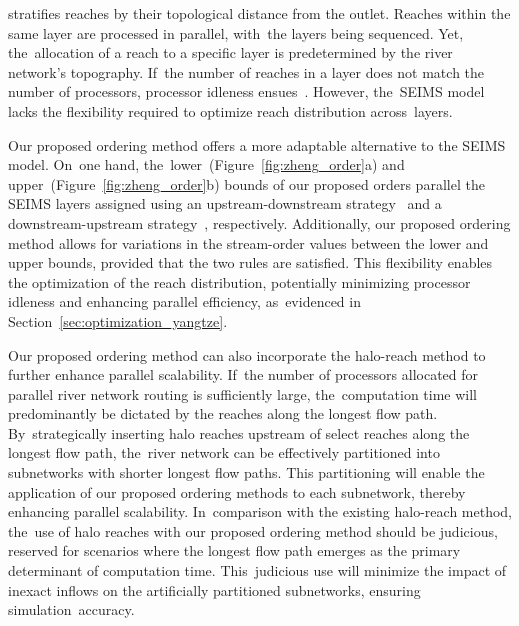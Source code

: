 \documentclass[water,article,accept,pdftex,moreauthors]{Definitions/mdpi}
\begin{document}
 stratifies reaches by their topological distance from the outlet. Reaches within the same layer are processed in parallel, with~the layers being sequenced. Yet, the~allocation of a reach to a specific layer is predetermined by the river network's topography. If~the number of reaches in a layer does not match the number of processors, processor idleness ensues~\cite{liu2014EMS, zhu2019EMS}. However, the~SEIMS model lacks the flexibility required to optimize reach distribution across~layers.

Our proposed ordering method offers a more adaptable alternative to the SEIMS model. On~one hand, the~lower~(Figure~\ref{fig:zheng_order}a) and upper~(Figure~\ref{fig:zheng_order}b) bounds of our proposed orders parallel the SEIMS layers assigned using an upstream-downstream strategy~\cite[Figure 6b]{zhu2019EMS} and a downstream-upstream strategy~\cite[Figure 6c]{zhu2019EMS}, respectively. Additionally, our proposed ordering method allows for variations in the stream-order values between the lower and upper bounds, provided that the two rules are satisfied. This flexibility enables the optimization of the reach distribution, potentially minimizing processor idleness and enhancing parallel efficiency, as~evidenced in Section~\ref{sec:optimization_yangtze}.

Our proposed ordering method can also incorporate the halo-reach method to further enhance parallel scalability. If~the number of processors allocated for parallel river network routing is sufficiently large, the~computation time will predominantly be dictated by the reaches along the longest flow path. By~strategically inserting halo reaches upstream of select reaches along the longest flow path, the~river network can be effectively partitioned into subnetworks with shorter longest flow paths. This partitioning will enable the application of our proposed ordering methods to each subnetwork, thereby enhancing parallel scalability. In~comparison with the existing halo-reach method, the~use of halo reaches with our proposed ordering method should be judicious, reserved for scenarios where the longest flow path emerges as the primary determinant of computation time. This~judicious use will minimize the impact of inexact inflows on the artificially partitioned subnetworks, ensuring simulation~accuracy.
\end{document}
